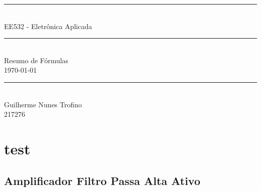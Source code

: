 \documentclass{article}
\begin{document}
    \begin{titlepage}
        \begin{center}
            \rule{450pt}{0.5pt}\\[4mm]
            {\Huge EE532 - Eletrônica Aplicada}\\
            \rule{450pt}{0.5pt}\\[2mm]
            {\Large Resumo de Fórmulas}\\[200mm]
            \today\\
            \rule{250pt}{0.5pt}\\
            {\large Guilherme Nunes Trofino}\\
            {\large 217276}\\
        \end{center}
    \end{titlepage}
\newpage

    \section{test}
    \subsection{Amplificador Filtro Passa Alta Ativo}
\end{document}
